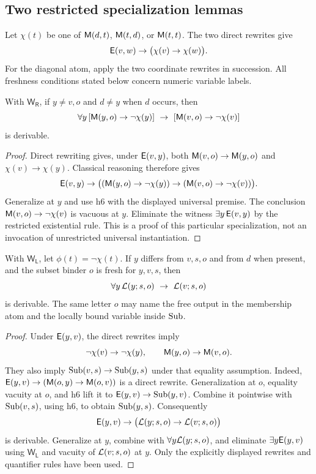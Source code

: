 \subsection{Two restricted specialization lemmas}

Let $\chi(t)$ be one of
$\mathsf M(d,t)$, $\mathsf M(t,d)$, or $\mathsf M(t,t)$. The two direct rewrites give
\[
 \mathsf E(v,w)\to\bigl(\chi(v)\to\chi(w)\bigr).
\]
For the diagonal atom, apply the two coordinate rewrites in succession.
All freshness conditions stated below concern numeric variable labels.

\begin{lemma}\label{lem:negative-upper}
With $\mathsf{W_R}$, if $y\ne v,o$ and $d\ne y$ when $d$ occurs, then
\[
 \forall y\,[\mathsf M(y,o)\to\neg\chi(y)]
 \ \to\ [\mathsf M(v,o)\to\neg\chi(v)]
\]
is derivable.
\end{lemma}
\begin{proof}
Direct rewriting gives, under $\mathsf E(v,y)$, both
$\mathsf M(v,o)\to\mathsf M(y,o)$ and $\chi(v)\to\chi(y)$. Classical reasoning
therefore gives
\[
 \mathsf E(v,y)\to
 \bigl((\mathsf M(y,o)\to\neg\chi(y))\to
       (\mathsf M(v,o)\to\neg\chi(v))\bigr).
\]
Generalize at $y$ and use h6 with the displayed universal premise.
The conclusion $\mathsf M(v,o)\to\neg\chi(v)$ is vacuous at $y$.
Eliminate the witness $\exists y\,\mathsf E(v,y)$ by the restricted
existential rule. This is a proof of this particular specialization,
not an invocation of unrestricted universal instantiation.
\end{proof}

\begin{lemma}\label{lem:negative-lower}
With $\mathsf{W_L}$, let $\phi(t)=\neg\chi(t)$. If $y$ differs from
$v,s,o$ and from $d$ when present, and the subset binder $o$ is fresh for
$y,v,s$, then
\[
 \forall y\,\Low(y;s,o)\ \to\ \Low(v;s,o)
\]
is derivable. The same letter $o$ may name the free output in the
membership atom and the locally bound variable inside $\operatorname{Sub}$.
\end{lemma}
\begin{proof}
Under $\mathsf E(y,v)$, the direct rewrites imply
\[
 \neg\chi(v)\to\neg\chi(y),\qquad
 \mathsf M(y,o)\to\mathsf M(v,o).
\]
They also imply $\operatorname{Sub}(v,s)\to\operatorname{Sub}(y,s)$ under that equality
assumption. Indeed,
$\mathsf E(y,v)\to(\mathsf M(o,y)\to\mathsf M(o,v))$ is a direct rewrite.
Generalization at $o$, equality vacuity at $o$, and h6 lift it to
$\mathsf E(y,v)\to\operatorname{Sub}(y,v)$. Combine it pointwise with
$\operatorname{Sub}(v,s)$, using h6, to obtain $\operatorname{Sub}(y,s)$. Consequently
\[
 \mathsf E(y,v)\to\bigl(\mathcal L(y;s,o)\to\mathcal L(v;s,o)\bigr)
\]
is derivable. Generalize at $y$, combine with $\forall y\mathcal L(y;s,o)$,
and eliminate $\exists y\mathsf E(y,v)$ using $\mathsf{W_L}$ and vacuity of
$\mathcal L(v;s,o)$ at $y$. Only the explicitly displayed rewrites and
quantifier rules have been used.
\end{proof}


